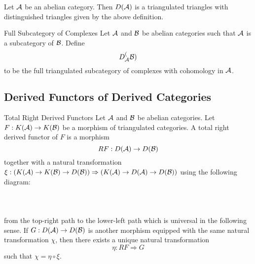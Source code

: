 \documentclass[a4paper]{article}
\begin{document}
\begin{thm}{}{} Let $\mathcal{A}$ be an abelian category. Then $D(\mathcal{A})$ is a triangulated triangles with distinguished triangles given by the above definition. 
\end{thm}

\begin{defn}{Full Subcategory of Complexes}{} Let $\mathcal{A}$ and $\mathcal{B}$ be abelian categories such that $\mathcal{A}$ is a subcategory of $\mathcal{B}$. Define $$D_{\mathcal{A}}^(\mathcal{B})$$ to be the full triangulated subcategory of complexes with cohomology in $\mathcal{A}$. 
\end{defn}

\subsection{Derived Functors of Derived Categories}
\begin{defn}{Total Right Derived Functors}{} Let $\mathcal{A}$ and $\mathcal{B}$ be abelian categories. Let $F:K(\mathcal{A})\to K(\mathcal{B})$ be a morphism of triangulated categories. A total right derived functor of $F$ is a morphism $$RF:D(\mathcal{A})\to D(\mathcal{B})$$ together with a natural transformation $\xi:(K(\mathcal{A})\to K(\mathcal{B})\to D(\mathcal{B}))\Rightarrow(K(\mathcal{A})\to D(\mathcal{A})\to D(\mathcal{B}))$ using the following diagram: \\~\\
\\~\\
from the top-right path to the lower-left path which is universal in the following sense. If $G:D(\mathcal{A})\to D(\mathcal{B})$ is another morphism equipped with the same natural transformation $\chi$, then there exists a unique natural transformation $$\eta:RF\Rightarrow G$$ such that $\chi=\eta\circ\xi$. 
\end{defn}
\end{document}
